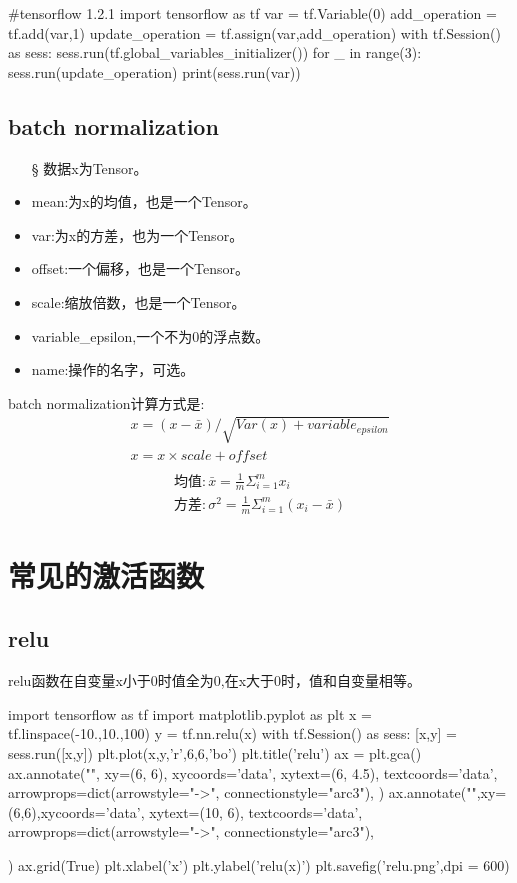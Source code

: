\begin{python}
#tensorflow 1.2.1
import tensorflow as tf
var = tf.Variable(0)
add_operation = tf.add(var,1)
update_operation = tf.assign(var,add_operation)
with tf.Session() as sess:
    sess.run(tf.global_variables_initializer())
    for _ in range(3):
        sess.run(update_operation)
        print(sess.run(var))
\end{python}
\subsection{batch normalization}

\begin{itemize}
	\item[\S] 数据x为Tensor。
\item mean:为x的均值，也是一个Tensor。
\item var:为x的方差，也为一个Tensor。
\item offset:一个偏移，也是一个Tensor。
\item scale:缩放倍数，也是一个Tensor。
\item variable\_epsilon,一个不为0的浮点数。
\item name:操作的名字，可选。
\end{itemize}
batch normalization计算方式是:
\begin{gather}
x = (x-\bar{x})/\sqrt{Var(x)+variable_{epsilon}}\\
x = x\times scale+offset\\
\end{gather}
\begin{gather}
\text{均值}:\bar{x} = \frac{1}{m}\Sigma_{i=1}^{m}x_i\\
\text{方差}:\sigma^2 = \frac{1}{m}\Sigma_{i=1}^m(x_i-\bar{x})
\end{gather}
\section{常见的激活函数}
\subsection{relu}
relu函数在自变量x小于0时值全为0,在x大于0时，值和自变量相等。
\begin{python}
import tensorflow as tf 
import matplotlib.pyplot as plt 
x = tf.linspace(-10.,10.,100)
y = tf.nn.relu(x)
with tf.Session() as sess:
	[x,y] = sess.run([x,y])
plt.plot(x,y,'r',6,6,'bo')
plt.title('relu')
ax = plt.gca()
ax.annotate("",
            xy=(6, 6), xycoords='data',
            xytext=(6, 4.5), textcoords='data',
            arrowprops=dict(arrowstyle="->",
                            connectionstyle="arc3"),
            )
ax.annotate("",xy=(6,6),xycoords='data',
            xytext=(10, 6), textcoords='data',
            arrowprops=dict(arrowstyle="->",
                            connectionstyle="arc3"),
	  	   
)
ax.grid(True)
plt.xlabel('x')
plt.ylabel('relu(x)')
plt.savefig('relu.png',dpi = 600)
\end{python}
